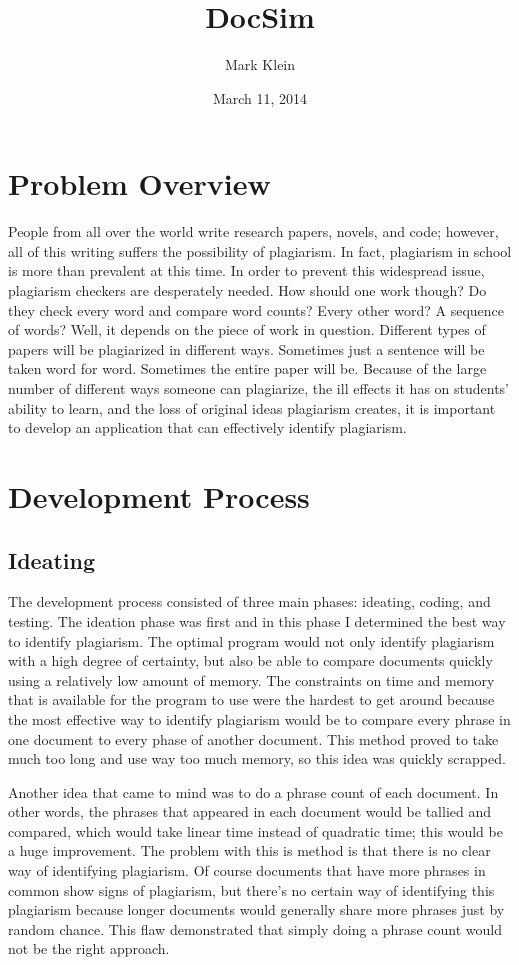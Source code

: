 \documentclass[11pt]{article} %
\title{DocSim}
\author{Mark Klein}
\date{March 11, 2014} %
\begin{document}
\maketitle

\section{Problem Overview}

	People from all over the world write research papers, novels, and code; however, all of this writing suffers the possibility of plagiarism. In fact, plagiarism in school is more than prevalent at this time. In order to prevent this widespread issue, plagiarism checkers are desperately needed. How should one work though? Do they check every word and compare word counts? Every other word? A sequence of words? Well, it depends on the piece of work in question. Different types of papers will be plagiarized in different ways. Sometimes just a sentence will be taken word for word. Sometimes the entire paper will be. Because of the large number of different ways someone can plagiarize, the ill effects it has on students' ability to learn, and the loss of original ideas plagiarism creates, it is important to develop an application that can effectively identify plagiarism. 

\section{Development Process}

\subsection{Ideating}

The development process consisted of three main phases: ideating, coding, and testing. The ideation phase was first and in this phase I determined the best way to identify plagiarism. The optimal program would not only identify plagiarism with a high degree of certainty, but also be able to compare documents quickly using a relatively low amount of memory. The constraints on time and memory that is available for the program to use were the hardest to get around because the most effective way to identify plagiarism would be to compare every phrase in one document to every phase of another document. This method proved to take much too long and use way too much memory, so this idea was quickly scrapped.

Another idea that came to mind was to do a phrase count of each document. In other words, the phrases that appeared in each document would be tallied and compared, which would take linear time instead of quadratic time; this would be a huge improvement. The problem with this is method is that there is no clear way of identifying plagiarism. Of course documents that have more phrases in common show signs of plagiarism, but there's no certain way of identifying this plagiarism because longer documents would generally share more phrases just by random chance. This flaw demonstrated that simply doing a phrase count would not be the right approach.
\end{document}
